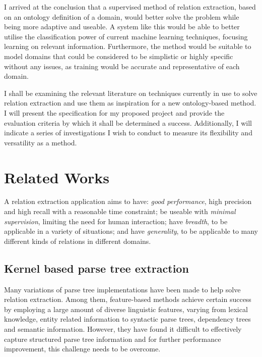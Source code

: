 \documentclass{ecmm427_assignment}
\begin{document}
I arrived at the conclusion that a supervised method of relation extraction, based on an ontology definition of a domain, would better solve the problem while being more adaptive and useable. A system like this would be able to better utilise the classification power of current machine learning techniques, focusing learning on relevant information. Furthermore, the method would be suitable to model domains that could be considered to be simplistic or highly specific without any issues, as training would be accurate and representative of each domain.

I shall be examining the relevant literature on techniques currently in use to solve relation extraction and use them as inspiration for a new ontology-based method. I will present the specification for my proposed project and provide the evaluation criteria by which it shall be determined a success. Additionally, I will indicate a series of investigations I wish to conduct to measure its flexibility and versatility as a method. 

\section{Related Works}

A relation extraction application aims to have: \textit{good performance}, high precision and high recall with a reasonable time constraint; be useable with \textit{minimal supervision}, limiting the need for human interaction; have \textit{breadth}, to be applicable in a variety of situations; and have \textit{generality}, to be applicable to many different kinds of relations in different domains.


\subsection{Kernel based parse tree extraction}

Many variations of parse tree implementations have been made to help solve relation extraction. Among them, feature-based methods achieve certain success by employing a large amount of diverse linguistic features, varying from lexical knowledge, entity related information to syntactic parse trees, dependency trees and semantic information. \cite{combining} \cite{exploringVarious} However, they have found it difficult to effectively capture structured parse tree information and for further performance improvement, this challenge needs to be overcome. \cite{exploringVarious} 
\end{document}
